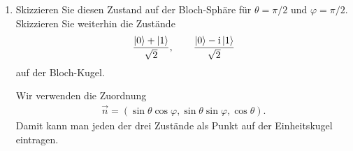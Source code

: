 \documentclass[11pt,a4paper]{scrartcl}
\newcommand{\e}{\mathrm e}
\newcommand{\ii}{\mathrm i}
\begin{document}
\begin{enumerate}[label=(\alph*)]
\begin{calculationbox}
            \begin{solutionbox}[title=Bloch-Vektor]
                Die drei Komponenten des Bloch-Vektors sind
                \begin{align*}
                    n_x&=\braket{\sigma_x}=\sin\theta\cos\varphi,\\
                    n_y&=\braket{\sigma_y}=\sin\theta\sin\varphi,\\
                    n_z&=\braket{\sigma_z}=\cos\theta.
                \end{align*}
                Also entspricht der Zustand
                \begin{align*}
                    \ket{\psi}
                    =
                    \cos\left(\frac{\theta}{2}\right)\ket{0}
                    +
                    \e^{\ii\varphi}\sin\left(\frac{\theta}{2}\right)\ket{1}
                \end{align*}
                dem Bloch-Vektor
                \begin{align*}
                    \vec n=
                    \left(
                        \sin\theta\cos\varphi,
                        \sin\theta\sin\varphi,
                        \cos\theta
                    \right).
                \end{align*}
            \end{solutionbox}
        \end{calculationbox}

        \item Skizzieren Sie diesen Zustand auf der Bloch-Sphäre für $\theta=\pi/2$ und $\varphi=\pi/2$. Skizzieren Sie weiterhin die Zustände
        \begin{align*}
            \frac{\ket{0}+\ket{1}}{\sqrt2},
            \qquad
            \frac{\ket{0}-\ii\ket{1}}{\sqrt2}
        \end{align*}
        auf der Bloch-Kugel.

        \begin{calculationbox}
            Wir verwenden die Zuordnung
            \begin{align*}
                \vec n=
                \left(
                    \sin\theta\cos\varphi,
                    \sin\theta\sin\varphi,
                    \cos\theta
                \right).
            \end{align*}
            Damit kann man jeden der drei Zustände als Punkt auf der Einheitskugel eintragen.


\end{calculationbox}
\end{enumerate}
\end{document}
